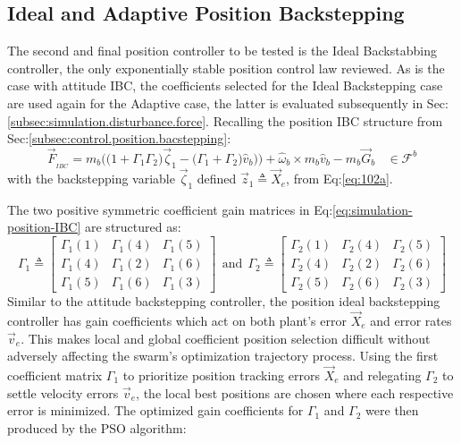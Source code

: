 \subsection{Ideal and Adaptive Position Backstepping}
\label{subsec:simulation.position.pd}
The second and final position controller to be tested is the Ideal Backstabbing controller, the only exponentially stable position control law reviewed. As is the case with attitude IBC, the coefficients selected for the Ideal Backstepping case are used again for the Adaptive case, the latter is evaluated subsequently in Sec:\ref{subsec:simulation.disturbance.force}. Recalling the position IBC structure from Sec:\ref{subsec:control.position.bacstepping}:
\begin{equation}\label{eq:simulation-position-IBC}
\vec{F}_{_{IBC}}=m_b\Big(\big(1+\Gamma_1\Gamma_2\big)\vec{\zeta}_1-\big(\Gamma_1+\Gamma_2\big)\hat{v}_b\big)\Big)+\hat{\omega}_b\times m_b\hat{v}_b-m_b\vec{G}_b~~~~\in\mathcal{F}^{b}
\end{equation}
with the backstepping variable $\vec{\zeta}_1$ defined $\vec{z}_1\triangleq \vec{X}_e$, from Eq:\ref{eq:102a}. 
\par
The two positive symmetric coefficient gain matrices in Eq:\ref{eq:simulation-position-IBC} are structured as:
\begin{equation}\label{eq:simulation-position-diagonal-coefficients}
\Gamma_1\triangleq \begin{bmatrix}
\Gamma_1(1) & \Gamma_1(4) & \Gamma_1(5)\\
\Gamma_1(4) & \Gamma_1(2) & \Gamma_1(6)\\
\Gamma_1(5) & \Gamma_1(6) & \Gamma_1(3)
\end{bmatrix}
~~\text{and}~~\Gamma_2\triangleq \begin{bmatrix}
\Gamma_2(1) & \Gamma_2(4) & \Gamma_2(5)\\
\Gamma_2(4) & \Gamma_2(2) & \Gamma_2(6)\\
\Gamma_2(5) & \Gamma_2(6) & \Gamma_2(3)
\end{bmatrix}
\end{equation}
Similar to the attitude backstepping controller, the position ideal backstepping controller has gain coefficients which act on both plant's error $\vec{X}_e$ and error rates $\vec{v}_e$. This makes local and global coefficient position selection difficult without adversely affecting the swarm's optimization trajectory process. Using the first coefficient matrix $\Gamma_1$ to prioritize position tracking errors $\vec{X}_e$ and relegating $\Gamma_2$ to settle velocity errors $\vec{v}_e$, the local best positions are chosen where each respective error is minimized. The optimized gain coefficients for $\Gamma_1$ and $\Gamma_2$ were then produced by the PSO algorithm:
